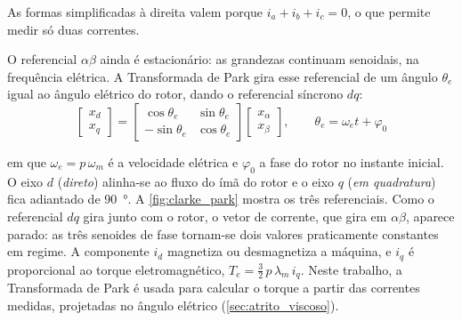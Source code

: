 \noindent As formas simplificadas à direita valem porque $i_a + i_b + i_c = 0$,
o que permite medir só duas correntes.

O referencial $\alpha\beta$ ainda é estacionário: as grandezas continuam
senoidais, na frequência elétrica. A Transformada de Park \cite{Park1929} gira
esse referencial de um ângulo $\theta_e$ igual ao ângulo elétrico do rotor,
dando o referencial síncrono $dq$:
\begin{equation}
    \begin{bmatrix} x_d \\ x_q \end{bmatrix}
    =
    \begin{bmatrix} \cos\theta_e & \sin\theta_e \\
    -\sin\theta_e & \cos\theta_e \end{bmatrix}
    \begin{bmatrix} x_\alpha \\ x_\beta \end{bmatrix},
    \qquad
    \theta_e = \omega_e t + \varphi_0
    \label{eq:park}
\end{equation}

\noindent em que $\omega_e = p\,\omega_m$ é a velocidade elétrica e $\varphi_0$
a fase do rotor no instante inicial. O eixo $d$ (\textit{direto}) alinha-se ao
fluxo do ímã do rotor e o eixo $q$ (\textit{em quadratura}) fica adiantado de
\SI{90}{\degree}. A \autoref{fig:clarke_park} mostra os três referenciais.
Como o referencial $dq$ gira junto com o rotor, o vetor de corrente, que gira
em $\alpha\beta$, aparece parado: as três senoides de fase tornam-se dois
valores praticamente constantes em regime. A componente $i_d$ magnetiza ou
desmagnetiza a máquina, e $i_q$ é proporcional ao torque eletromagnético,
$T_e = \tfrac{3}{2}\,p\,\lambda_m\,i_q$. Neste trabalho, a Transformada de Park
é usada para calcular o torque a partir das correntes medidas, projetadas no
ângulo elétrico (\autoref{sec:atrito_viscoso}).

